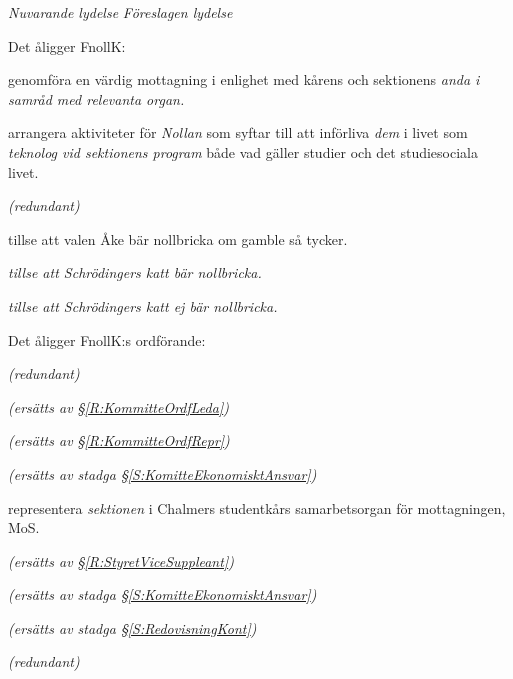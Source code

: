 \documentclass{article}
\newenvironment{lydelse}
    {\begin{paracol}{2}%
        \emph{Nuvarande lydelse}%
        \switchcolumn%
        \emph{Föreslagen lydelse}%
    \end{paracol}%
    \begin{enumerate}[label=\thesubsection.\arabic*]%
    \begin{paracol}{2}%
    }{\end{paracol}\end{enumerate}}
\begin{document}
\begin{lydelse}
    \item Det åligger FnollK:\vspace{-0.4em}
    \begin{aligganden}
        \item genomföra en värdig mottagning i enlighet med kårens och sektionens \emph{anda i samråd med relevanta organ.}
        \item arrangera aktiviteter för \emph{Nollan} som syftar till att införliva \emph{dem} i livet som \emph{teknolog vid sektionens program} både vad gäller studier och det studiesociala livet.\vspace{0.2em}
        \item[] \emph{(redundant)}\vspace{2.6em}
        \item tillse att valen Åke bär nollbricka om gamble så tycker.
        \item \emph{tillse att Schrödingers katt bär nollbricka.}
        \item \emph{tillse att Schrödingers katt ej bär nollbricka.}
    \end{aligganden}
    
   
    \item Det åligger FnollK:s ordförande: \vspace{-0.2em}
    \begin{aligganden}
        \item[] \emph{(redundant)}
        \item[] \emph{(ersätts av \S \ref{R:KommitteOrdfLeda})}
        \item[] \emph{(ersätts av \S \ref{R:KommitteOrdfRepr})}\vspace{3em}
        \item[] \emph{(ersätts av stadga \S \ref{S:KomitteEkonomisktAnsvar})}\vspace{1.2em}
        \item representera \emph{sektionen} i Chalmers studentkårs samarbetsorgan för mottagningen, MoS.
    \end{aligganden}
    
    \vspace{2.4em}
    \begin{aligganden}
        \item[] \emph{(ersätts av \S \ref{R:StyretViceSuppleant})} \vspace{6.4em}
        \item[] \emph{(ersätts av stadga \S \ref{S:KomitteEkonomisktAnsvar})}\vspace{1.6em}
        \item[] \emph{(ersätts av stadga \S \ref{S:RedovisningKont})}\vspace{1.6em}
        \item[] \emph{(redundant)}
    \end{aligganden}
\end{lydelse}
\end{document}
